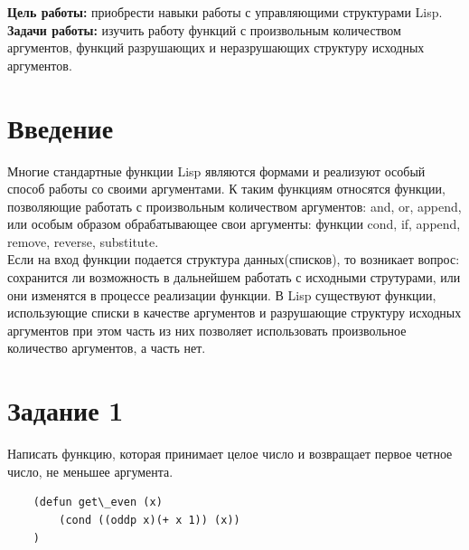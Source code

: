 \documentclass[a4paper, 12pt]{article}
\begin{document}
\tableofcontents
\clearpage
\newpage

\textbf{Цель работы:} приобрести навыки работы с управляющими структурами Lisp.
\\ \hspace*{5mm} \textbf{Задачи работы:} изучить работу функций с произвольным количеством аргументов, функций разрушающих и неразрушающих структуру исходных аргументов.


\section*{Введение}

\hspace*{5mm} Многие стандартные функции Lisp являются формами и реализуют особый способ работы со своими аргументами. К таким функциям относятся функции, позволяющие работать с произвольным количеством аргументов: and, or, append, или особым образом обрабатывающее свои аргументы: функции cond, if, append, remove, reverse, substitute.
\\ \hspace*{5mm} Если на вход функции подается структура данных(списков), то возникает вопрос: сохранится ли возможность в дальнейшем работать с исходными струтурами, или они изменятся в процессе реализации функции. В Lisp существуют функции, использующие списки в качестве аргументов и разрушающие структуру исходных аргументов при этом часть из них позволяет использовать произвольное количество аргументов, а часть нет.
\clearpage
\newpage




\lstset{style=mystyle}

\section*{Задание 1}
Написать функцию, которая принимает целое число и возвращает первое четное число, не меньшее аргумента.\\
\begin{lstlisting}
	(defun get\_even (x) 
		(cond ((oddp x)(+ x 1)) (x))
	)
\end{lstlisting}
\end{document}
